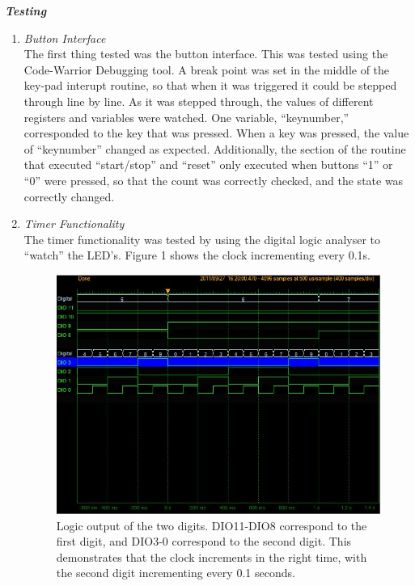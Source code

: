 \documentclass[10pt]{article}
\begin{document}
\emph{\textbf{Testing}}
\begin{enumerate}
\item \emph{Button Interface}
\\The first thing tested was the button interface. This was tested using the 
Code-Warrior Debugging tool. A break point was set in the middle of the
key-pad interupt routine, so that when it was triggered it could be stepped
through line by line. As it was stepped through, the values of different
registers and variables were watched. One variable, ``keynumber,'' corresponded
to the key that was pressed. When a key was pressed, the value of ``keynumber'' changed
as expected. Additionally, the section of the routine that executed ``start/stop'' and
``reset'' only executed when buttons ``1'' or ``0'' were pressed, so that
the count was correctly checked, and the state was correctly changed. 

\item \emph{Timer Functionality} 
\\The timer functionality was tested by 
using the digital logic analyser to ``watch'' the LED's. Figure 1 shows the clock
incrementing every 0.1s. 
\begin{figure}[h!]
\centering
\includegraphics[width=300pt,keepaspectratio]{Figure1}
\caption{\small{Logic output of the two digits. DIO11-DIO8 correspond to the 
first digit,
and DIO3-0 correspond to the second digit. This demonstrates that the clock
increments in the right time, with the second digit incrementing every 0.1 seconds. }}
\end{figure}


\end{enumerate}
\end{document}
